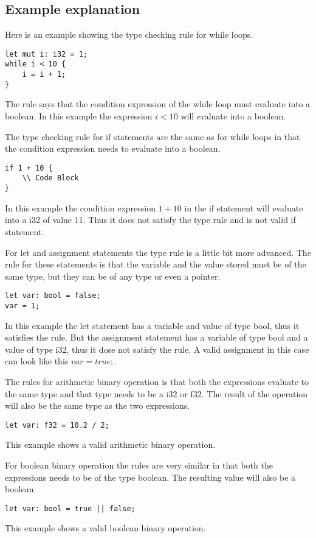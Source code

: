 \documentclass[12pt]{article}
\begin{document}
	\subsection{Example explanation}
	Here is an example showing the type checking rule for while loops.
    	\begin{verbatim}
let mut i: i32 = 1;
while i < 10 {
    i = i + 1;
}
    	\end{verbatim}
	The rule says that the condition expression of the while loop must evaluate into a boolean. In this example the expression $i < 10$ will evaluate into a boolean.

	The type checking rule for if statements are the same as for while loops in that the condition expression needs to evaluate into a boolean. 
    	\begin{verbatim}
if 1 + 10 {
    \\ Code Block
}
    	\end{verbatim}
	In this example the condition expression $1 + 10$ in the if statement will evaluate into a i32 of value 11. Thus it does not satisfy the type rule and is not valid if statement.

	For let and assignment statements the type rule is a little bit more advanced. The rule for these statements is that the variable and the value stored must be of the same type, but they can be of any type or even a pointer.
    	\begin{verbatim}
let var: bool = false;
var = 1;
    	\end{verbatim}
	In this example the let statement has a variable and value of type bool, thus it satisfies the rule. But the assignment statement has a variable of type bool and a value of type i32, thus it dose not satisfy the rule. A valid assignment in this case can look like this $var = true;$.


	The rules for arithmetic binary operation is that both the expressions evaluate to the same type and that type needs to be a i32 or f32. The result of the operation will also be the same type as the two expressions.
    	\begin{verbatim}
let var: f32 = 10.2 / 2;
    	\end{verbatim}
	This example shows a valid arithmetic binary operation.

	For boolean binary operation the rules are very similar in that both the expressions needs to be of the type boolean. The resulting value will also be a boolean.
    	\begin{verbatim}
let var: bool = true || false;
    	\end{verbatim}
	This example shows a valid boolean binary operation.
\end{document}
